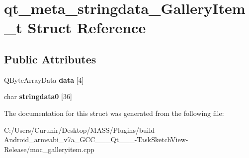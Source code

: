 \hypertarget{structqt__meta__stringdata___gallery_item__t}{}\section{qt\+\_\+meta\+\_\+stringdata\+\_\+\+Gallery\+Item\+\_\+t Struct Reference}
\label{structqt__meta__stringdata___gallery_item__t}
\subsection*{Public Attributes}
\begin{DoxyCompactItemize}
\item 
\mbox{\label{structqt__meta__stringdata___gallery_item__t_aa7ac18f40b3e3a29d69d4c41359fc886}} 
Q\+Byte\+Array\+Data {\bfseries data} \mbox{[}4\mbox{]}
\item 
\mbox{\label{structqt__meta__stringdata___gallery_item__t_ab1540d7608cb990dbd0fbd25dc86a19c}} 
char {\bfseries stringdata0} \mbox{[}36\mbox{]}
\end{DoxyCompactItemize}


The documentation for this struct was generated from the following file\+:\begin{DoxyCompactItemize}
\item 
C\+:/\+Users/\+Curunir/\+Desktop/\+M\+A\+S\+S/\+Plugins/build-\/\+Android\+\_\+armeabi\+\_\+v7a\+\_\+\+G\+C\+C\+\_\+\_\+\_\+\+Qt\+\_\+\_\+\_-\/\+Task\+Sketch\+View-\/\+Release/moc\+\_\+galleryitem.\+cpp\end{DoxyCompactItemize}
